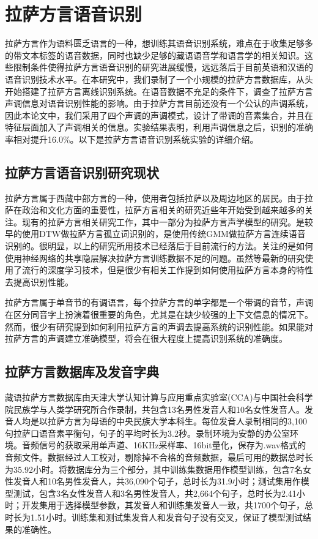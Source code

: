 ﻿%

\chapter{拉萨方言语音识别}
拉萨方言作为语料匮乏语言的一种，想训练其语音识别系统，难点在于收集足够多的带文本标签的语音数据，同时也缺少足够的藏语语音学和语言学的相关知识。这些限制条件使得拉萨方言语音识别的研究进展缓慢，远远落后于目前英语和汉语的语音识别技术水平。在本研究中，我们录制了一个小规模的拉萨方言数据库，从头开始搭建了拉萨方言离线识别系统。在语音数据不充足的条件下，调查了拉萨方言声调信息对语音识别性能的影响。由于拉萨方言目前还没有一个公认的声调系统，因此本论文中，我们采用了四个声调的声调模式，设计了带调的音素集合，并且在特征层面加入了声调相关的信息。实验结果表明，利用声调信息之后，识别的准确率相对提升16.0\%。以下是拉萨方言语音识别系统实验的详细介绍。
\section{拉萨方言语音识别研究现状}
拉萨方言属于西藏中部方言的一种，使用者包括拉萨以及周边地区的居民。由于拉萨在政治和文化方面的重要性，拉萨方言相关的研究近些年开始受到越来越多的关注。现有的拉萨方言相关研究工作，其中一部分为拉萨方言声学模型的研究。\cite{yao2009research}是较早的使用DTW做拉萨方言孤立词识别的，\cite{li2012research}\cite{li2014large}是使用传统GMM做拉萨方言连续语音识别的。很明显，以上的研究所用技术已经落后于目前流行的方法。\cite{wang2014cross}\cite{zhao2015shared}关注的是如何使用神经网络的共享隐层解决拉萨方言训练数据不足的问题。虽然\cite{wang2014cross}\cite{zhao2015shared}等最新的研究使用了流行的深度学习技术，但是很少有相关工作提到如何使用拉萨方言本身的特性去提高识别性能。

拉萨方言属于单音节的有调语言，每个拉萨方言的单字都是一个带调的音节，声调在区分同音字上扮演着很重要的角色，尤其是在缺少较强的上下文信息的情况下。然而，很少有研究提到如何利用拉萨方言的声调去提高系统的识别性能。如果能对拉萨方言的声调建立准确模型，将会在很大程度上提高识别系统的准确度。
\section{拉萨方言数据库及发音字典}
藏语拉萨方言数据库由天津大学认知计算与应用重点实验室(CCA)与中国社会科学院民族学与人类学研究所合作录制，共包含13名男性发音人和10名女性发音人。发音人均是以拉萨方言为母语的中央民族大学本科生。每位发音人录制相同的3,100句拉萨口语音素平衡句，句子的平均时长为3.2秒。录制环境为安静的办公室环境。音频信号的获取采用单声道、16KHz采样率、16bit量化，保存为.wav格式的音频文件。数据经过人工校对，剔除掉不合格的音频数据，最后可用的数据总时长为35.92小时。将数据库分为三个部分，其中训练集数据用作模型训练，包含7名女性发音人和10名男性发音人，共36,090个句子，总时长为31.9小时；测试集用作模型测试，包含3名女性发音人和3名男性发音人，共2,664个句子，总时长为2.41小时；开发集用于选择模型参数，其发音人和训练集发音人一致，共1700个句子，总时长为1.51小时。训练集和测试集发音人和发音句子没有交叉，保证了模型测试结果的准确性。

